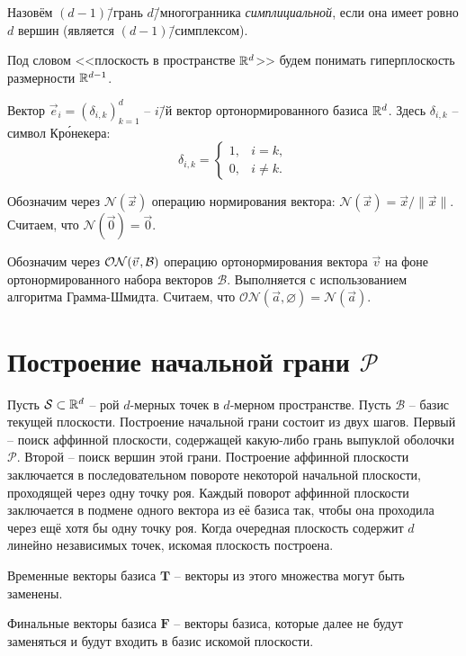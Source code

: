 \documentclass[a4paper,12pt]{article}
\newcommand{\R}[1][]{%
  \ifthenelse{\equal{#1}{}}%
  {\mathbb{R}}%
  {\mathbb{R}^{#1}}}
\newcommand{\Swarm}{\mathcal{S}}              %
\newcommand{\Polyhedron}{\mathcal{P}}         %
\newcommand{\Basis}{\mathcal{B}}              %
\newcommand{\ZVec}{\vec 0}                    %
\newcommand{\norm}[2][]{#1\lVert #2 #1\rVert}             %
\newcommand{\Norm}[2][]{\mathcal{N}#1( #2 #1)} %
\newcommand{\ONorm}[3][]{\mathcal{ON}#1( #2, #3 #1)} %
\newcommand{\TempVec}{\mathbf{T}}  %
\newcommand{\FinalVec}{\mathbf{F}} %
\renewcommand{\.}{\hspace{0.2ex}}
\begin{document}
  Назовём $(d-1)$\=/грань $d$\=/многогранника \textit{симплициальной}, если она имеет ровно $d$ вершин (является $(d-1)$\=/симплексом).



  Под словом <<плоскость в пространстве $\R[d]$>> будем понимать гиперплоскость размерности $\R[d-1]$.

  Вектор $\vec e_i = (\delta_{i,k})_{k=1}^d$ -- $i$\=/й вектор ортонормированного базиса $\R[d]$.
  Здесь $\delta_{i,k}$ -- символ Кр\'{о}некера:
  $$
  \delta_{i,k} =
  \begin{cases}
    1, & i=k, \\
    0, & i\neq k.
  \end{cases}
  $$

  Обозначим через $\Norm{\vec x}$ операцию нормирования вектора: $\Norm{\vec x} = \vec x \big / \norm{\vec x}$. Считаем, что $\Norm{\ZVec} = \ZVec$.

  Обозначим через $\ONorm{\vec v \.}{\Basis}$ операцию ортонормирования вектора $\vec v$ на фоне ортонормированного набора векторов $\Basis$. Выполняется с использованием алгоритма Грамма-Шмидта. Считаем, что $\ONorm{\vec a}{\varnothing} = \Norm{\vec a}$.


\section{Построение начальной грани $\Polyhedron$}
  Пусть $\Swarm \subset \R[d]$ -- рой $d$-мерных точек в $d$-мерном пространстве.
  Пусть $\Basis$ -- базис текущей плоскости. Построение начальной грани состоит из двух шагов. Первый -- поиск аффинной плоскости, содержащей какую-либо грань выпуклой оболочки $\Polyhedron$. Второй -- поиск вершин этой грани. Построение аффинной плоскости заключается в последовательном повороте некоторой начальной плоскости, проходящей через одну точку роя. Каждый поворот аффинной плоскости заключается в подмене одного вектора из её базиса так, чтобы она проходила через ещё хотя бы одну точку роя. Когда очередная плоскость содержит $d$ линейно независимых точек, искомая плоскость построена.

  Временные векторы базиса $\TempVec$ -- векторы из этого множества могут быть заменены.

  Финальные векторы базиса $\FinalVec$ -- векторы базиса, которые далее не будут заменяться и будут входить в базис искомой плоскости.
\end{document}
